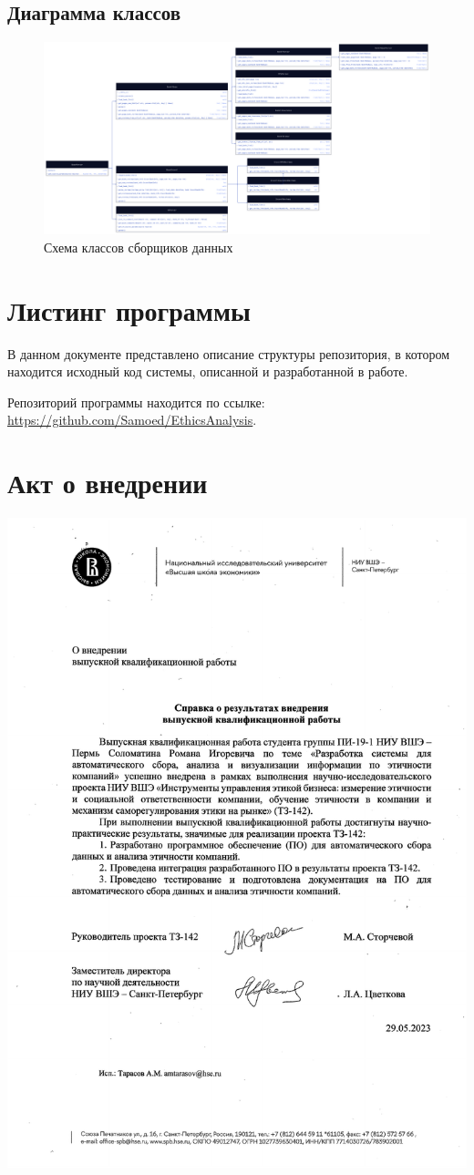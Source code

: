 \documentclass[PI, VKR]{HSEUniversity}
\begin{document}
\begin{landscape}
\chapter{Диаграмма классов}
\label{sec:org302338d}
\begin{figure}[h!]
\centering
\includegraphics[width=.9\linewidth]{img/d2/parser_class.png}
\caption{\label{fig:parser_class_diagram}Схема классов сборщиков данных}
\end{figure}
\end{landscape}
\chapter{Листинг программы}
\label{sec:orgb3b52c7}
В данном документе представлено описание структуры репозитория, в котором находится исходный код системы, описанной и разработанной в работе.

Репозиторий программы находится по ссылке: \url{https://github.com/Samoed/EthicsAnalysis}.
\chapter{Акт о внедрении}
\label{sec:org52a5832}
\hspace*{-2cm}\includegraphics[scale=0.85]{img/deployment_act.pdf}
\end{document}
